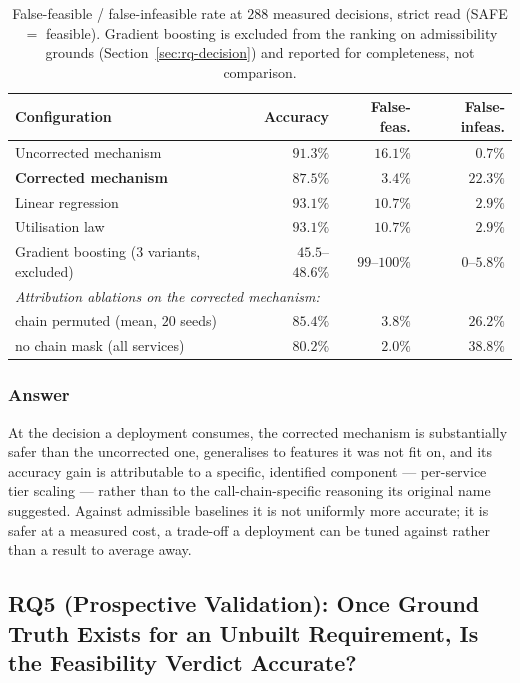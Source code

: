 \documentclass[journal, 10pt]{IEEEtran}
\begin{document}
\begin{table}[!t]
\centering
\caption{False-feasible / false-infeasible rate at $288$ measured decisions,
strict read (SAFE $=$ feasible). Gradient boosting is excluded from the
ranking on admissibility grounds (Section~\ref{sec:rq-decision}) and reported
for completeness, not comparison.}
\label{tab:verdict-accuracy}
\footnotesize
\begin{tabular}{lrrr}
\toprule
\textbf{Configuration} & \textbf{Accuracy} & \textbf{False-feas.} & \textbf{False-infeas.} \\
\midrule
Uncorrected mechanism & $91.3\%$ & $16.1\%$ & $0.7\%$ \\
\textbf{Corrected mechanism} & $87.5\%$ & $\mathbf{3.4\%}$ & $22.3\%$ \\
Linear regression & $93.1\%$ & $10.7\%$ & $2.9\%$ \\
Utilisation law & $93.1\%$ & $10.7\%$ & $2.9\%$ \\
Gradient boosting (3 variants, excluded) & $45.5$--$48.6\%$ & $99$--$100\%$ & $0$--$5.8\%$ \\
\midrule
\multicolumn{4}{l}{\emph{Attribution ablations on the corrected mechanism:}} \\
\quad chain permuted (mean, $20$ seeds) & $85.4\%$ & $3.8\%$ & $26.2\%$ \\
\quad no chain mask (all services) & $80.2\%$ & $2.0\%$ & $38.8\%$ \\
\bottomrule
\end{tabular}
\end{table}

\subsubsection{Answer}
At the decision a deployment consumes, the corrected mechanism is
substantially safer than the uncorrected one, generalises to features it was
not fit on, and its accuracy gain is attributable to a specific, identified
component --- per-service tier scaling --- rather than to the call-chain-specific
reasoning its original name suggested. Against admissible baselines it is not
uniformly more accurate; it is safer at a measured cost, a trade-off a
deployment can be tuned against rather than a result to average away.


\subsection{RQ5 (Prospective Validation): Once Ground Truth Exists for an Unbuilt Requirement, Is the Feasibility Verdict Accurate?}
\label{sec:rq6}
\end{document}
